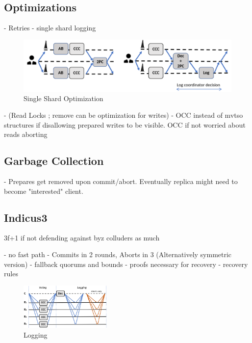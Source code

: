 \subsection{Optimizations}
- Retries
- single shard logging
\begin{figure}
\begin{center}
\includegraphics[width= \textwidth]{./figures/SingleShard.png}
\end{center}
\caption{Single Shard Optimization}
\label{fig:Figure1}
\end{figure}


- (Read Locks ; remove can be optimization for writes)
- OCC instead of mvtso structures if disallowing prepared writes to be visible. OCC if not worried about reads aborting

\subsection{Garbage Collection}
- Prepares get removed upon commit/abort. Eventually replica might need to become "interested" client.

\subsection{Indicus3}
3f+1 if not defending against byz colluders as much

- no fast path
- Commits in 2 rounds, Aborts in 3 (Alternatively symmetric version)
- fallback quorums and bounds
- proofs necessary for recovery
- recovery rules

\begin{figure}
\begin{center}
\includegraphics[width= 0.4\textwidth]{./figures/3f+1.png}
\end{center}
\caption{Logging}
\label{fig:Figure1}
\end{figure}



